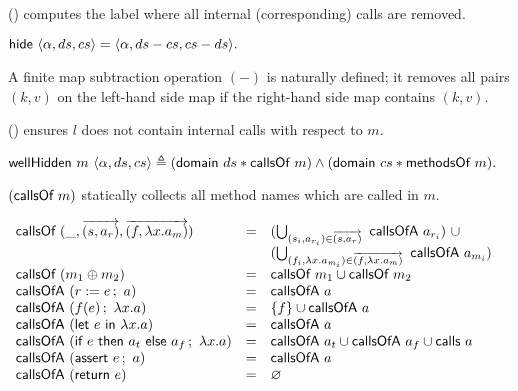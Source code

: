 () computes the label where all internal (corresponding) calls
are removed.

\begin{definition}
  \label{def-hide}
  \mbox{}
  \begin{center}
    \begin{math}
      \hide{\semlbl{\alpha}{ds}{cs}} = \semlbl{\alpha}{ds - cs}{cs - ds}.
    \end{math}
  \end{center}
\end{definition}

A finite map subtraction operation $(-)$ is naturally defined; it
removes all pairs $(k, v)$ on the left-hand side map if the right-hand
side map contains $(k, v)$.

() ensures $l$ does not contain internal calls with
respect to $m$.

\begin{definition}
  \label{def-wellhidden}
  \mbox{}
  \begin{center}
    \begin{math}
      \wellhidden{m}{\semlbl{\alpha}{ds}{cs}} \triangleq
      (\keysdisj{ds}{\callsofm{m}}) \wedge (\keysdisj{cs}{\methsofm{m}}).
    \end{math}
  \end{center}
\end{definition}

$(\callsofm{m})$ statically collects all method names which are called
in $m$.

\begin{definition}
  \label{def-callsof}
  \mbox{}
  \begin{center}
    \begin{math}
      \begin{array}{lcl}
        \callsofm{(\_, \listof{\rulepair{s}{a_r}}, \listof{\methodpair{f}{\lambda x.a_m}})}
        & = & (\bigcup_{(s_i, a_{r_i}) \in \listof{\rulepair{s}{a_r}}}\ \callsofa{a_{r_i}})\ \cup \\
        & & (\bigcup_{(f_i, \lambda x.a_{m_i}) \in \listof{\methodpair{f}{\lambda x.a_m}}}\ \callsofa{a_{m_i}}) \\
        \callsofm{(\modcomp{m_1}{m_2})} & = & \callsofm{m_1} \cup \callsofm{m_2} \\
        \callsofa{(\actwrite{r}{e}{a})} & = & \callsofa{a} \\
        \callsofa{(\actcall{x}{f}{e}{a})} & = & \{ f \} \cup \callsofa{a} \\
        \callsofa{(\actlet{e}{x}{a})} & = & \callsofa{a} \\
        \callsofa{(\actifelse{e}{a_t}{a_f}{x}{a})} & = & \callsofa{a_t} \cup \callsofa{a_f} \cup \callsof{a} \\
        \callsofa{(\actassert{e}{a})} & = & \callsofa{a} \\
        \callsofa{(\actret{e})} & = & \emptyset \\
      \end{array}
    \end{math}
  \end{center}
\end{definition}


